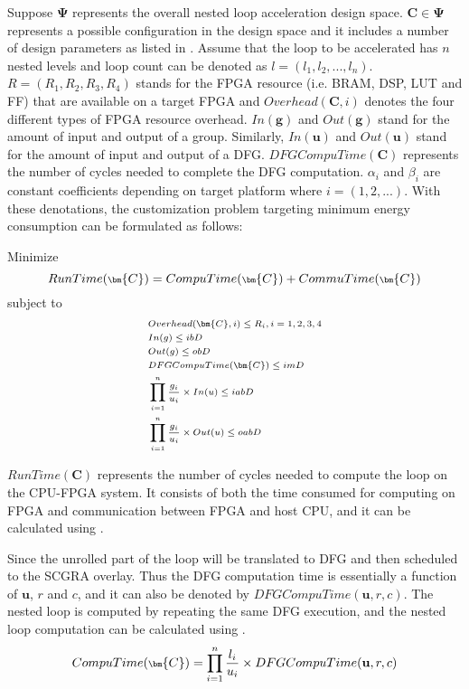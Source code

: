 Suppose $\bm{\Psi}$ represents the overall nested loop acceleration design 
space. $\bm{C} \in \bm{\Psi}$ represents a possible configuration in 
the design space and it includes a number of design parameters as  
listed in . Assume that the loop to be accelerated 
has $n$ nested levels and loop count can be denoted as $l=(l_1, l_2, ..., l_n)$.
$R=(R_1, R_2, R_3, R_4)$ stands for the FPGA resource (i.e. BRAM, DSP, LUT and FF) 
that are available on a target FPGA and $Overhead(\bm{C}, i)$ denotes the 
four different types of FPGA resource overhead. $In(\bm{g})$ and $Out(\bm{g})$ 
stand for the amount of input and output of a group. Similarly, $In(\bm{u})$ 
and $Out(\bm{u})$ stand for the amount of input and output of a DFG. 
$DFGCompuTime(\bm{C})$ represents the number of cycles needed to 
complete the DFG computation. $\alpha_i$ and $\beta_i$ are constant 
coefficients depending on target platform where $i=(1,2,...)$. With these denotations, 
the customization problem targeting minimum energy consumption can be formulated 
as follows:

Minimize 
\begin{equation} \label{eq:runtime}
    \scriptsize
    RunTime(\bm{C})=CompuTime(\bm{C})+CommuTime(\bm{C})
\end{equation}
subject to
\begin{equation} \label{eq:constraints}
    \scriptsize
    \begin{split}
        &Overhead(\bm{C}, i) \leq R_i, i=1,2,3,4 \\
        &In(g) \leq ibD \\
        &Out(g) \leq obD \\
        &DFGCompuTime(\bm{C}) \leq imD \\
        &\displaystyle \prod_{i=1}^{n} \frac{g_i}{u_i} \times In(u) \leq iabD \\
        &\displaystyle \prod_{i=1}^{n} \frac{g_i}{u_i} \times Out(u) \leq oabD
    \end{split}
\end{equation}

$RunTime(\bm{C})$ represents the number of cycles needed to compute the loop on 
the CPU-FPGA system. It consists of both the time consumed for computing on FPGA and 
communication between FPGA and host CPU, and it can be calculated using .

Since the unrolled part of the loop will be translated to 
DFG and then scheduled to the SCGRA overlay. Thus the DFG computation time 
is essentially a function of $\mathbf{u}$, $r$ and $c$, and it can also be 
denoted by $DFGCompuTime(\mathbf{u},r,c)$.
The nested loop is computed by repeating the same DFG execution, and the 
nested loop computation can be calculated using .
\begin{equation} \label{eq:loopexetime}
    \scriptsize
    CompuTime(\bm{C})=\displaystyle \prod_{i=1}^{n} \frac{l_i}{u_i} \times DFGCompuTime(\mathbf{u},r,c)
\end{equation}

